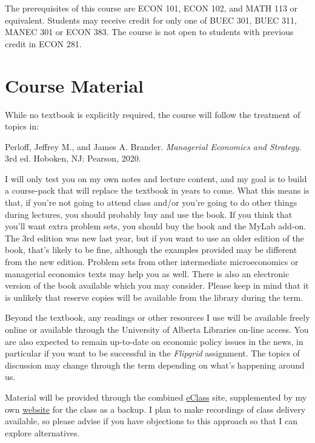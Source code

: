 \documentclass[11pt,]{article}
\begin{document}
The prerequisites of this course are ECON 101, ECON 102, and MATH 113 or
equivalent. Students may receive credit for only one of BUEC 301, BUEC
311, MANEC 301 or ECON 383. The course is not open to students with
previous credit in ECON 281.

\hypertarget{course-material}{%
\section{Course Material}\label{course-material}}

While no textbook is explicitly required, the course will follow the
treatment of topics in:

\begin{center}
\begin{minipage}{.8\linewidth}
Perloff, Jeffrey M., and James A. Brander. \textit{Managerial Economics and Strategy}. 3rd ed. Hoboken, NJ: Pearson, 2020.
\end{minipage}
\end{center}

I will only test you on my own notes and lecture content, and my goal is
to build a course-pack that will replace the textbook in years to come.
What this means is that, if you're not going to attend class and/or
you're going to do other things during lectures, you should probably buy
and use the book. If you think that you'll want extra problem sets, you
should buy the book and the MyLab add-on. The 3rd edition was new last
year, but if you want to use an older edition of the book, that's likely
to be fine, although the examples provided may be different from the new
edition. Problem sets from other intermediate microeconomics or
managerial economics texts may help you as well. There is also an
electronic version of the book available which you may consider. Please
keep in mind that it is unlikely that reserve copies will be available
from the library during the term.

Beyond the textbook, any readings or other resources I use will be
available freely online or available through the University of Alberta
Libraries on-line access. You are also expected to remain up-to-date on
economic policy issues in the news, in particular if you want to be
successful in the \textit{Flipgrid} assignment. The topics of discussion
may change through the term depending on what's happening around us.

Material will be provided through the combined \href{https://eclass.srv.ualberta.ca/course/view.php?id=70884}{eClass} site, supplemented by my own \href{https://buec311.aleach.ca}{website} for the class as a
backup. I plan to make recordings of class delivery available, so please
advise if you have objections to this approach so that I can explore
alternatives.
\end{document}
